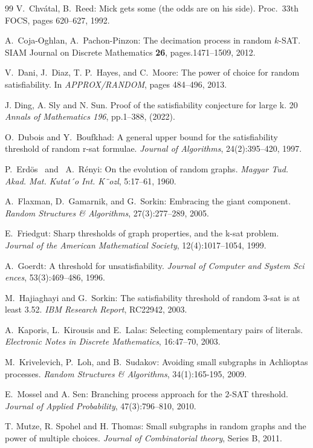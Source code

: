 \documentclass[11pt,reqno]{amsart}
\numberwithin{equation}{section}
\newcommand{\Erdos}{Erd\"os}
\newcommand{\Renyi}{R\'enyi}
\newcommand{\Chvatal}{Chv\'{a}tal}
\begin{document}
\begin{thebibliography}{99}
	 V.~\Chvatal, B.~Reed: Mick gets some (the odds are on his side).  Proc.~33th FOCS, pages 620--627, 1992.
	
	 A.\ Coja-Oghlan, A.\ Pachon-Pinzon: The decimation process in random $k$-SAT. SIAM Journal on Discrete Mathematics {\bf 26}, pages.1471--1509, 2012.
	
	  V.\ Dani, J.\ Diaz, T. P.\ Hayes, and C.\ Moore: The power of choice for random satisfiability.
	In \emph{APPROX/RANDOM}, pages 484–496, 2013. 
	
	
	 J. Ding, A. Sly and N. Sun. Proof of the satisfiability conjecture for large k. 20 \emph{Annals of Mathematics 196}, pp.1--388, (2022).
	
	 O.\ Dubois and Y.\ Boufkhad: A general upper bound for the satisfiability threshold of
	random r-sat formulae.
	\emph{Journal of Algorithms}, 24(2):395–420, 1997.
	
	
	  P.~\Erdos~ and~ A.~\Renyi: On the evolution of random graphs. \emph{ Magyar Tud. Akad. Mat.
	Kutat´o Int. K¨ozl}, 5:17–61, 1960.
	
	 A.\ Flaxman, D.\ Gamarnik, and G.\ Sorkin:  Embracing the giant component. \emph{Random Structures \& Algorithms}, 27(3):277–289, 2005. 
	
	 E.\ Friedgut: Sharp thresholds of graph properties, and the k-sat problem. \emph{Journal of the
		American Mathematical Society}, 12(4):1017–1054, 1999.
	
	 A.\ Goerdt: A threshold for unsatisfiability. \emph{Journal of Computer and System Sci
		ences}, 53(3):469–486, 1996.
	
	 M.\ Hajiaghayi and G.\ Sorkin: The satisfiability threshold of random 3-sat is at least 3.52.
	\emph{IBM Research Report}, RC22942, 2003.
	
	 A.\ Kaporis, L.\ Kirousis and E.\ Lalas: Selecting complementary pairs of literals. \emph{Electronic Notes in Discrete Mathematics}, 16:47--70, 2003. 
	
	 M.\ Krivelevich, P.\ Loh, and B.\ Sudakov: 
	Avoiding small subgraphs in Achlioptas processes.
	\emph{Random Structures \& Algorithms}, 34(1):165-195, 2009.	
	
	 E.\ Mossel and A. Sen: Branching process approach for the $2$-SAT threshold.
	\emph{Journal of Applied Probability}, 47(3):796–810, 2010. 
	
	 T. Mutze, R. Spohel and H. Thomas: Small subgraphs in random graphs and the power of multiple choices. \emph{Journal of Combinatorial theory}, Series B, 2011.
	

\end{thebibliography}
\end{document}
